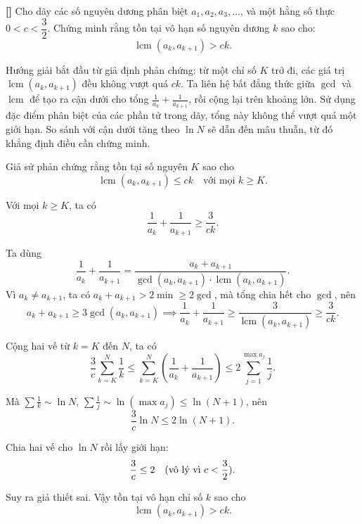 \documentclass[../01-divisibility.tex]{subfiles}
\begin{document}
\begin{example*}\label{example:CHN-2015-TST1-D1-P2}\textbf{[]}
	Cho dãy các số nguyên dương phân biệt \( a_1, a_2, a_3, \ldots \), và một hằng số thực \( 0 < c < \dfrac{3}{2} \).  
	Chứng minh rằng tồn tại vô hạn số nguyên dương \( k \) sao cho:
	\[
		\operatorname{lcm}(a_k, a_{k+1}) > c k.
	\]
\end{example*}

\begin{story*}
	Hướng giải bắt đầu từ giả định phản chứng: từ một chỉ số \( K \) trở đi, các giá trị \( \operatorname{lcm}(a_k, a_{k+1}) \) đều không vượt quá \( ck \).  
	Ta liên hệ bất đẳng thức giữa \( \gcd \) và \( \operatorname{lcm} \) để tạo ra cận dưới cho tổng \( \frac{1}{a_k} + \frac{1}{a_{k+1}} \), rồi cộng lại trên khoảng lớn.  
	Sử dụng đặc điểm phân biệt của các phần tử trong dãy, tổng này không thể vượt quá một giới hạn. So sánh với cận dưới tăng theo \( \ln N \) sẽ dẫn đến mâu thuẫn, từ đó khẳng định điều cần chứng minh.
\end{story*}

\begin{soln}\footnotemark
	Giả sử phản chứng rằng tồn tại số nguyên \( K \) sao cho
	\[
		\operatorname{lcm}(a_k, a_{k+1}) \le ck \quad \text{với mọi } k \ge K.
	\]

	\begin{claim*}
		Với mọi \( k \ge K \), ta có
		\[
			\frac{1}{a_k} + \frac{1}{a_{k+1}} \ge \frac{3}{ck}.
		\]
	\end{claim*}

	\begin{subproof}
		Ta dùng
		\[
			\frac{1}{a_k} + \frac{1}{a_{k+1}} = 
			\frac{a_k + a_{k+1}}{\gcd(a_k, a_{k+1}) \cdot \operatorname{lcm}(a_k, a_{k+1})}.
		\]
		Vì \( a_k \ne a_{k+1} \), ta có \( a_k + a_{k+1} > 2\min \ge 2\gcd \), mà tổng chia hết cho \( \gcd \), nên
		\[
			a_k + a_{k+1} \ge 3\gcd(a_k, a_{k+1}) \implies \frac{1}{a_k} + \frac{1}{a_{k+1}} \ge \frac{3}{\operatorname{lcm}(a_k, a_{k+1})} \ge \frac{3}{ck}.
		\]
	\end{subproof}

	Cộng hai vế từ \( k = K \) đến \( N \), ta có
	\[
		\frac{3}{c} \sum_{k=K}^N \frac{1}{k}
		\le \sum_{k=K}^N \left( \frac{1}{a_k} + \frac{1}{a_{k+1}} \right)
		\le 2 \sum_{j=1}^{\max a_j} \frac{1}{j}.
	\]

	Mà \( \sum \frac{1}{k} \sim \ln N \), \( \sum \frac{1}{j} \sim \ln (\max a_j) \le \ln(N+1) \), nên
	\[
		\frac{3}{c} \ln N \le 2 \ln(N + 1).
	\]

	Chia hai vế cho \( \ln N \) rồi lấy giới hạn:
	\[
		\frac{3}{c} \le 2 \quad \text{(vô lý vì \( c < \frac{3}{2} \))}.
	\]

	Suy ra giả thiết sai. Vậy tồn tại vô hạn chỉ số \( k \) sao cho
	\[
		\boxed{\operatorname{lcm}(a_k, a_{k+1}) > ck.}
	\]
\end{soln}

\end{document}
